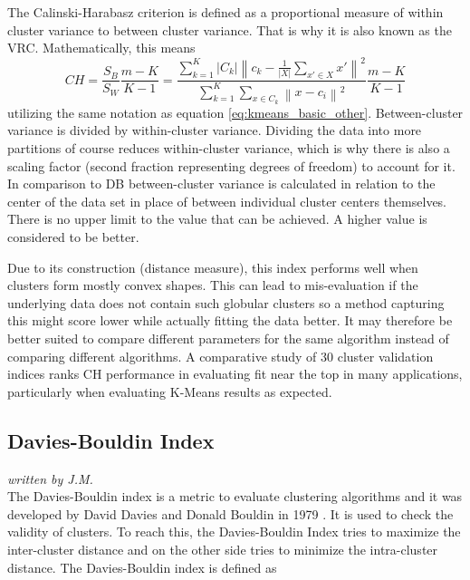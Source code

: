 The Calinski-Harabasz criterion \cite{calinski1974dendrite} is defined as a proportional measure of within cluster variance to between cluster variance. That is why it is also known as the \gls{VRC}. Mathematically, this means
\begin{equation}
        CH = \frac{S_{B}}{S_{W}}\frac{m-K}{K-1} = \frac{\sum_{k=1}^{K} \left | C_{k} \right | \left \| c_{k} - \frac{1}{\left | X \right |}\sum_{x' \in X}^{} x' \right \|^{2}}{\sum_{k=1}^{K}\sum_{x \in C_{k}}^{} \left \| x - c_{i} \right \|^{2}} \frac{m-K}{K-1}
\end{equation}
utilizing the same notation as equation \ref{eq:kmeans_basic_other}. Between-cluster variance is divided by within-cluster variance. Dividing the data into more partitions of course reduces within-cluster variance, which is why there is also a scaling factor (second fraction representing degrees of freedom) to account for it. In comparison to \gls{DB} between-cluster variance is calculated in relation to the center of the data set in place of between individual cluster centers themselves. There is no upper limit to the value that can be achieved. A higher value is considered to be better.

Due to its construction (distance measure), this index performs well when clusters form mostly convex shapes. This can lead to mis-evaluation if the underlying data does not contain such globular clusters so a method capturing this might score lower while actually fitting the data better. It may therefore be better suited to compare different parameters for the same algorithm instead of comparing different algorithms. A comparative study of 30 cluster validation indices \cite{arbelaitz2013extensive} ranks \gls{CH} performance in evaluating fit near the top in many applications, particularly when evaluating K-Means results as expected.
    
    
\subsection{Davies-Bouldin Index}
\textit{written by J.M.}\\

The Davies-Bouldin index is a metric to evaluate clustering algorithms and it was developed by David Davies and Donald Bouldin in 1979 \cite{davies1979cluster}. 
It is used to check the validity of clusters. To reach this, the Davies-Bouldin Index tries to maximize the inter-cluster distance 
and on the other side tries to minimize the intra-cluster distance. 
The Davies-Bouldin index is defined as 
	
